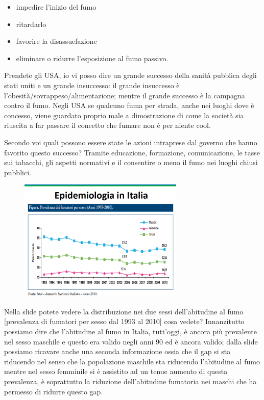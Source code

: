 \begin{itemize}
\item
  impedire l'inizio del fumo
\item
  ritardarlo
\item
  favorire la disassuefazione
\item
  eliminare o ridurre l'esposizione al fumo passivo.
\end{itemize}

Prendete gli USA, io vi posso dire un grande successo della sanità
pubblica degli stati uniti e un grande insuccesso: il grande insuccesso
è l'obesità/sovrappeso/alimentazione; mentre il grande successo è la
campagna contro il fumo. Negli USA se qualcuno fuma per strada, anche
nei luoghi dove è concesso, viene guardato proprio male a dimostrazione
di come la società sia riuscita a far passare il concetto che fumare non
è per niente cool.

Secondo voi quali possono essere state le azioni intraprese dal governo
che hanno favorito questo successo? Tramite educazione, formazione,
comunicazione, le tasse sui tabacchi, gli aspetti normativi e il
consentire o meno il fumo nei luoghi chiusi pubblici.

\begin{figure}[!ht]
\centering
	\includegraphics[width=0.7\textwidth]{17/image4.png}
	\end{figure}

Nella slide potete vedere la distribuzione nei due sessi dell'abitudine
al fumo {[}prevalenza di fumatori per sesso dal 1993 al 2010{]} cosa
vedete? Innanzitutto possiamo dire che l'abitudine al fumo in Italia,
tutt'oggi, è ancora più prevalente nel sesso maschile e questo era
valido negli anni 90 ed è ancora valido; dalla slide possiamo ricavare
anche una seconda informazione ossia che il gap si sta riducendo nel
senso che la popolazione maschile sta riducendo l'abitudine al fumo
mentre nel sesso femminile si è assistito ad un tenue aumento di questa
prevalenza, è soprattutto la riduzione dell'abitudine fumatoria nei
maschi che ha permesso di ridurre questo gap.

